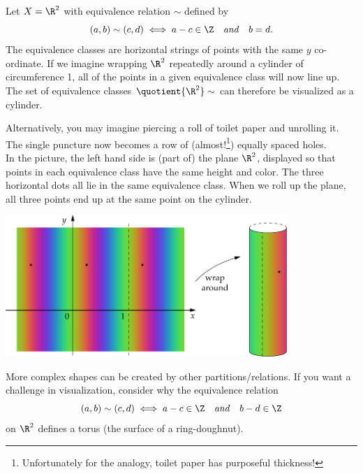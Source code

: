 Let $X=\R^2$ with equivalence relation $\sim$ defined by
\[(a,b)\sim (c,d)\iff
a-c\in\Z\quad\text{\emph{and}}\quad b=d.\]
The equivalence classes are horizontal strings of points with the same $y$ co-ordinate. If we imagine wrapping $\R^2$ repeatedly around a cylinder of circumference 1, all of the points in a given equivalence class will now line up. The set of equivalence classes $\quotient{\R^2}\sim$ can therefore be visualized as a cylinder.

Alternatively, you may imagine piercing a roll of toilet paper and unrolling it. The single puncture now becomes a row of (almost!\footnote{Unfortunately for the analogy, toilet paper has purposeful thickness!}) equally spaced holes.\\

In the picture, the left hand side is (part of) the plane $\R^2$, displayed so that points in each equivalence class have the same height and color. The three horizontal dots all lie in the same equivalence class. When we roll up the plane, all three points end up at the same point on the cylinder.

\begin{center}
\includegraphics[width=0.8\textwidth]{relations-13-cylinder}
\end{center}

More complex shapes can be created by other partitions/relations. If you want a challenge in visualization, consider why the equivalence relation
\[(a,b)\sim (c,d)\iff a-c\in\Z\quad\text{\emph{and}}\quad b-d\in\Z\]
on $\R^2$ defines a torus (the surface of a ring-doughnut).


